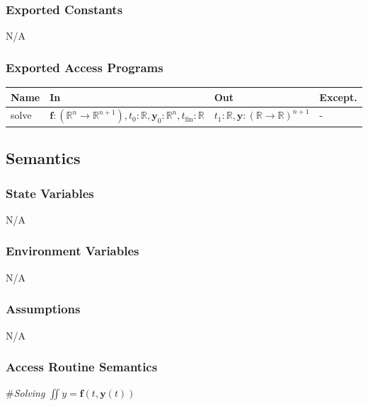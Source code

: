 \documentclass[12pt, titlepage]{article}
\begin{document}
\subsubsection{Exported Constants}
N/A
\subsubsection{Exported Access Programs}

\begin{center}
\begin{tabular}{p{1.5cm} >{\raggedright\arraybackslash}p{9.25cm} >{\raggedright\arraybackslash}p{2.4cm} p{1.5cm}}
  \hline
  \textbf{Name} & \textbf{In} & \textbf{Out} & \textbf{Except.} \\
  \hline
  solve & $\textbf{f}: (\mathbb{R}^{n} \rightarrow \mathbb{R}^{n+1}), t_0 : \mathbb{R},
          \textbf{y}_0: \mathbb{R}^n, 
          t_\text{fin}: \mathbb{R}$ & $t_1: \mathbb{R}, 
                                      \textbf{y}:
                                      (\mathbb{R}
                                      \rightarrow
                                      \mathbb{R})^{n+1}$ & -\\

  \hline 
\end{tabular}
\end{center}
\subsection{Semantics}

\subsubsection{State Variables}
N/A

\subsubsection{Environment Variables}

N/A
\subsubsection{Assumptions}

N/A
\subsubsection{Access Routine Semantics}

\#\textit{Solving} $ $$\iint {y} $$ = \mathbf{f}(t,
\mathbf{y}(t))$\\
\end{document}
